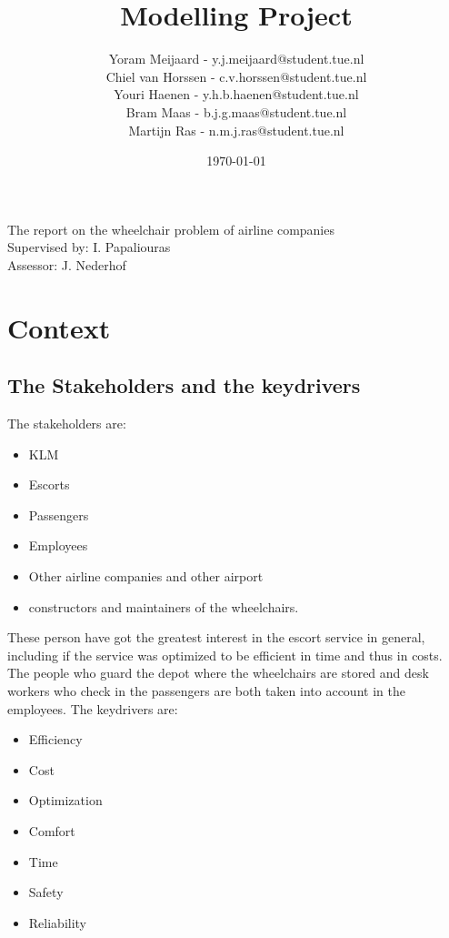 \documentclass[a4paper, 11pt, notitlepage]{report}
\title{{\Huge Modelling Project} \vspace{290pt}} %
\author{Yoram Meijaard - y.j.meijaard@student.tue.nl\\Chiel van Horssen - c.v.horssen@student.tue.nl\\Youri Haenen - y.h.b.haenen@student.tue.nl\\Bram Maas - b.j.g.maas@student.tue.nl\\Martijn Ras - n.m.j.ras@student.tue.nl} %
\date{\today} %
\begin{document}
\maketitle
\begin{center}
The report on the wheelchair problem of airline companies %
\\[12pt]
Supervised by: I. Papaliouras \\ Assessor: J. Nederhof %
\end{center}
\thispagestyle{empty}
\newpage


\tableofcontents







\setcounter{chapter}{+5}
\chapter{Context}
\section{The Stakeholders and the keydrivers }
The stakeholders are:
\begin{itemize}
 \item KLM
 \item Escorts
 \item Passengers
 \item Employees
 \item Other airline companies and other airport
 \item  constructors and maintainers of the wheelchairs.
\end{itemize}
These person have got the greatest interest in the escort service in general, including if the service was optimized to be efficient in time and thus in costs. The people who guard the depot where the wheelchairs are stored and desk workers who check in the passengers are both taken into account in the employees. The keydrivers are:
\begin{itemize}
	\item Efficiency
	\item Cost
	\item Optimization
	\item Comfort
	\item Time
	\item Safety
	\item Reliability
\end{itemize}
\end{document}
